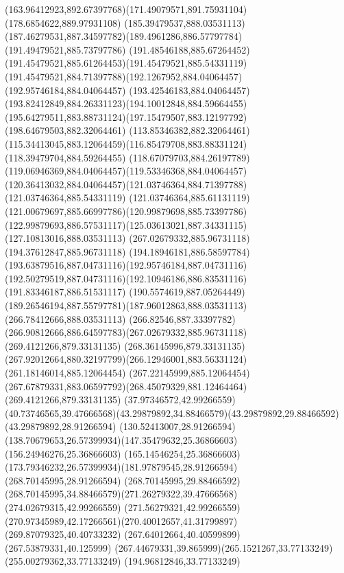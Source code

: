 {{\curveto(163.96412923,892.67397768)(171.49079571,891.75931104)(178.6854622,889.97931108)
\moveto(185.39479537,888.03531113)
\curveto(187.46279531,887.34597782)(189.4961286,886.57797784)(191.49479521,885.73797786)
\curveto(191.48546188,885.67264452)(191.45479521,885.61264453)(191.45479521,885.54331119)
\curveto(191.45479521,884.71397788)(192.1267952,884.04064457)(192.95746184,884.04064457)
\curveto(193.42546183,884.04064457)(193.82412849,884.26331123)(194.10012848,884.59664455)
\curveto(195.64279511,883.88731124)(197.15479507,883.12197792)(198.64679503,882.32064461)
\lineto(113.85346382,882.32064461)
\curveto(115.34413045,883.12064459)(116.85479708,883.88331124)(118.39479704,884.59264455)
\curveto(118.67079703,884.26197789)(119.06946369,884.04064457)(119.53346368,884.04064457)
\curveto(120.36413032,884.04064457)(121.03746364,884.71397788)(121.03746364,885.54331119)
\curveto(121.03746364,885.61131119)(121.00679697,885.66997786)(120.99879698,885.73397786)
\curveto(122.99879693,886.57531117)(125.03613021,887.34331115)(127.10813016,888.03531113)
\closepath
\moveto(267.02679332,885.96731118)
\lineto(194.37612847,885.96731118)
\curveto(194.18946181,886.58597784)(193.63879516,887.04731116)(192.95746184,887.04731116)
\curveto(192.50279519,887.04731116)(192.10946186,886.83531116)(191.83346187,886.51531117)
\curveto(190.5574619,887.05264449)(189.26546194,887.55797781)(187.96012863,888.03531113)
\lineto(266.78412666,888.03531113)
\curveto(266.82546,887.33397782)(266.90812666,886.64597783)(267.02679332,885.96731118)
\moveto(269.4121266,879.33131135)
\lineto(268.36145996,879.33131135)
\curveto(267.92012664,880.32197799)(266.12946001,883.56331124)(261.18146014,885.12064454)
\lineto(267.22145999,885.12064454)
\curveto(267.67879331,883.06597792)(268.45079329,881.12464464)(269.4121266,879.33131135)
\moveto(37.97346572,42.99266559)
\curveto(40.73746565,39.47666568)(43.29879892,34.88466579)(43.29879892,29.88466592)
\lineto(43.29879892,28.91266594)
\lineto(130.52413007,28.91266594)
\curveto(138.70679653,26.57399934)(147.35479632,25.36866603)(156.24946276,25.36866603)
\curveto(165.14546254,25.36866603)(173.79346232,26.57399934)(181.97879545,28.91266594)
\lineto(268.70145995,28.91266594)
\lineto(268.70145995,29.88466592)
\curveto(268.70145995,34.88466579)(271.26279322,39.47666568)(274.02679315,42.99266559)
\lineto(271.56279321,42.99266559)
\curveto(270.97345989,42.17266561)(270.40012657,41.31799897)(269.87079325,40.40733232)
\lineto(267.64012664,40.40599899)
\lineto(267.53879331,40.125999)
\curveto(267.44679331,39.865999)(265.1521267,33.77133249)(255.00279362,33.77133249)
\lineto(194.96812846,33.77133249)
}}
